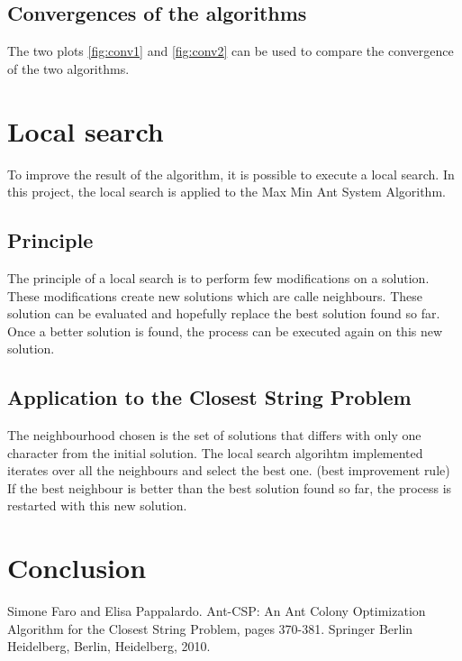 \documentclass{article}
\begin{document}
\subsection{Convergences of the algorithms}

The two plots \ref{fig:conv1} and \ref{fig:conv2} can be used to compare the convergence of the two algorithms.

\section{Local search}

To improve the result of the algorithm, it is possible to execute a local search.
In this project, the local search is applied to the Max Min Ant System Algorithm.

\subsection{Principle}


The principle of a local search is to perform few modifications on a solution.
These modifications create new solutions which are calle neighbours.
These solution can be evaluated and hopefully replace the best solution found so far.
Once a better solution is found, the process can be executed again on this new solution.

\subsection{Application to the Closest String Problem}

The neighbourhood chosen is the set of solutions that differs with only one character from the initial solution.
The local search algorihtm implemented iterates over all the neighbours and select the best one. (best improvement rule)
If the best neighbour is better than the best solution found so far, the process is restarted with this new solution. \newline



\section*{Conclusion}

\begin{thebibliography}{2}

 Simone Faro and Elisa Pappalardo.
Ant-CSP: An Ant Colony Optimization Algorithm for the Closest String Problem, pages 370-381.
Springer Berlin
Heidelberg, Berlin, Heidelberg, 2010.

\end{thebibliography}
\end{document}
